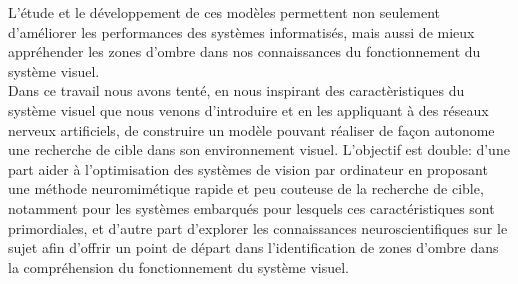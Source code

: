 L'étude et le développement de ces modèles permettent non seulement d'améliorer les performances des systèmes informatisés, mais aussi de mieux appréhender les zones d'ombre dans nos connaissances du fonctionnement du système visuel. \autocite{Werner2014} \\

Dans ce travail nous avons tenté, en nous inspirant des caractèristiques du système visuel que nous venons d'introduire et en les appliquant à des réseaux nerveux artificiels, de construire un modèle pouvant réaliser de façon autonome une recherche de cible dans son environnement visuel.
L'objectif est double: d'une part aider à l'optimisation des systèmes de vision par ordinateur en proposant une méthode neuromimétique rapide et peu couteuse de la recherche de cible, notamment pour les systèmes embarqués pour lesquels ces caractéristiques sont primordiales, et d'autre part d'explorer les connaissances neuroscientifiques sur le sujet afin d'offrir un point de départ dans l'identification de zones d'ombre dans la compréhension du fonctionnement du système visuel.